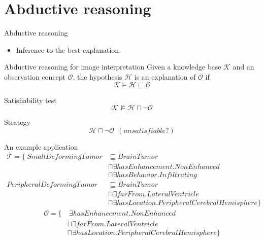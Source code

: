 \documentclass{beamer}
\begin{document}
\section{Abductive reasoning}
\begin{frame}{Abductive reasoning}
\begin{itemize}
 \item Inference to the best explanation.
\end{itemize}
\begin{block}{Abductive reasoning for image interpretation}
 Given a knowledge base $\mathcal{K}$ and an observation concept $\mathcal{O}$, the  hypothesis $\mathcal{H}$ is an explanation of  $\mathcal{O}$ if  $$\mathcal{K}\vDash \mathcal{H}\sqsubseteq \mathcal{O}$$
\end{block}

\begin{block}{Satisfiability test}
$$\mathcal{K}\nvDash \mathcal{H}\sqcap \neg \mathcal{O}$$
\end{block}

\begin{exampleblock}{Strategy}
 $$\mathcal{H}\sqcap \neg\mathcal{O}~~(unsatisfiable?)$$ 
 
\end{exampleblock}
\end{frame}

\begin{frame}{An example application}
 \begin{align*}
\mathcal{T}=\{~SmallDeformingTumor &\sqsubseteq BrainTumor\\
 &\sqcap \exists hasEnhancement. NonEnhanced \\
&\sqcap \exists hasBehavior. Infiltrating  \\
PeripheralDeformingTumor &\sqsubseteq BrainTumor\\
& \sqcap \exists farFrom. LateralVentricle \\
& \sqcap \exists hasLocation. PeripheralCerebralHemisphere \} 
\end{align*}\vspace{-0.9cm}
\begin{align*}
\mathcal{O} =\{&~\exists hasEnhancement. NonEnhanced \\
 &\sqcap \exists farFrom. LateralVentricle \\
&\sqcap \exists hasLocation. PeripheralCerebralHemisphere \} 
\end{align*}
\end{frame}
\end{document}
